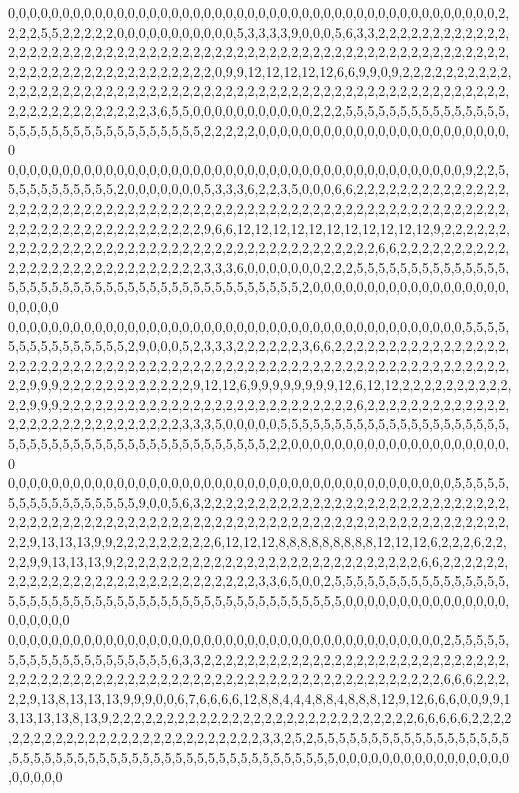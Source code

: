 0,0,0,0,0,0,0,0,0,0,0,0,0,0,0,0,0,0,0,0,0,0,0,0,0,0,0,0,0,0,0,0,0,0,0,0,0,0,0,0,0,0,0,0,0,2,2,2,2,5,5,2,2,2,2,2,0,0,0,0,0,0,0,0,0,0,0,5,3,3,3,3,9,0,0,0,5,6,3,3,2,2,2,2,2,2,2,2,2,2,2,2,2,2,2,2,2,2,2,2,2,2,2,2,2,2,2,2,2,2,2,2,2,2,2,2,2,2,2,2,2,2,2,2,2,2,2,2,2,2,2,2,2,2,2,2,2,2,2,2,2,2,2,2,2,2,2,2,2,2,2,2,2,2,2,2,2,0,9,9,12,12,12,12,12,6,6,9,9,0,9,2,2,2,2,2,2,2,2,2,2,2,2,2,2,2,2,2,2,2,2,2,2,2,2,2,2,2,2,2,2,2,2,2,2,2,2,2,2,2,2,2,2,2,2,2,2,2,2,2,2,2,2,2,2,2,2,2,2,2,2,2,2,2,2,2,2,2,2,2,3,6,5,5,0,0,0,0,0,0,0,0,0,0,0,2,2,2,5,5,5,5,5,5,5,5,5,5,5,5,5,5,5,5,5,5,5,5,5,5,5,5,5,5,5,5,5,5,5,5,5,2,2,2,2,2,0,0,0,0,0,0,0,0,0,0,0,0,0,0,0,0,0,0,0,0,0,0,0,0
0,0,0,0,0,0,0,0,0,0,0,0,0,0,0,0,0,0,0,0,0,0,0,0,0,0,0,0,0,0,0,0,0,0,0,0,0,0,0,0,0,0,9,2,2,5,5,5,5,5,5,5,5,5,5,5,2,0,0,0,0,0,0,0,5,3,3,3,6,2,2,3,5,0,0,0,6,6,2,2,2,2,2,2,2,2,2,2,2,2,2,2,2,2,2,2,2,2,2,2,2,2,2,2,2,2,2,2,2,2,2,2,2,2,2,2,2,2,2,2,2,2,2,2,2,2,2,2,2,2,2,2,2,2,2,2,2,2,2,2,2,2,2,2,2,2,2,2,2,2,2,2,2,2,2,2,9,6,6,12,12,12,12,12,12,12,12,12,12,12,9,2,2,2,2,2,2,2,2,2,2,2,2,2,2,2,2,2,2,2,2,2,2,2,2,2,2,2,2,2,2,2,2,2,2,2,2,2,2,2,2,6,6,2,2,2,2,2,2,2,2,2,2,2,2,2,2,2,2,2,2,2,2,2,2,2,2,2,2,2,2,3,3,3,6,0,0,0,0,0,0,0,2,2,2,5,5,5,5,5,5,5,5,5,5,5,5,5,5,5,5,5,5,5,5,5,5,5,5,5,5,5,5,5,5,5,5,5,5,5,5,5,5,5,5,5,2,0,0,0,0,0,0,0,0,0,0,0,0,0,0,0,0,0,0,0,0,0,0,0
0,0,0,0,0,0,0,0,0,0,0,0,0,0,0,0,0,0,0,0,0,0,0,0,0,0,0,0,0,0,0,0,0,0,0,0,0,0,0,0,0,0,5,5,5,5,5,5,5,5,5,5,5,5,5,5,5,2,9,0,0,0,5,2,3,3,3,2,2,2,2,2,2,3,6,6,2,2,2,2,2,2,2,2,2,2,2,2,2,2,2,2,2,2,2,2,2,2,2,2,2,2,2,2,2,2,2,2,2,2,2,2,2,2,2,2,2,2,2,2,2,2,2,2,2,2,2,2,2,2,2,2,2,2,2,2,2,2,2,2,9,9,9,2,2,2,2,2,2,2,2,2,2,2,2,9,12,12,6,9,9,9,9,9,9,9,9,12,6,12,12,2,2,2,2,2,2,2,2,2,2,2,2,9,9,9,2,2,2,2,2,2,2,2,2,2,2,2,2,2,2,2,2,2,2,2,2,2,2,2,2,2,2,6,2,2,2,2,2,2,2,2,2,2,2,2,2,2,2,2,2,2,2,2,2,2,2,2,2,2,2,2,2,3,3,3,5,0,0,0,0,0,5,5,5,5,5,5,5,5,5,5,5,5,5,5,5,5,5,5,5,5,5,5,5,5,5,5,5,5,5,5,5,5,5,5,5,5,5,5,5,5,5,5,5,5,5,2,2,0,0,0,0,0,0,0,0,0,0,0,0,0,0,0,0,0,0,0,0,0
0,0,0,0,0,0,0,0,0,0,0,0,0,0,0,0,0,0,0,0,0,0,0,0,0,0,0,0,0,0,0,0,0,0,0,0,0,0,0,0,0,5,5,5,5,5,5,5,5,5,5,5,5,5,5,5,5,5,9,0,0,5,6,3,2,2,2,2,2,2,2,2,2,2,2,2,2,2,2,2,2,2,2,2,2,2,2,2,2,2,2,2,2,2,2,2,2,2,2,2,2,2,2,2,2,2,2,2,2,2,2,2,2,2,2,2,2,2,2,2,2,2,2,2,2,2,2,2,2,2,2,2,2,2,2,2,2,2,2,2,9,13,13,13,9,9,2,2,2,2,2,2,2,2,2,6,12,12,12,8,8,8,8,8,8,8,8,8,12,12,12,6,2,2,2,6,2,2,2,2,9,9,13,13,13,9,2,2,2,2,2,2,2,2,2,2,2,2,2,2,2,2,2,2,2,2,2,2,2,2,2,2,2,2,6,6,2,2,2,2,2,2,2,2,2,2,2,2,2,2,2,2,2,2,2,2,2,2,2,2,2,2,2,2,2,3,3,6,5,0,0,2,5,5,5,5,5,5,5,5,5,5,5,5,5,5,5,5,5,5,5,5,5,5,5,5,5,5,5,5,5,5,5,5,5,5,5,5,5,5,5,5,5,5,5,5,5,5,5,0,0,0,0,0,0,0,0,0,0,0,0,0,0,0,0,0,0,0,0,0
0,0,0,0,0,0,0,0,0,0,0,0,0,0,0,0,0,0,0,0,0,0,0,0,0,0,0,0,0,0,0,0,0,0,0,0,0,0,0,0,2,5,5,5,5,5,5,5,5,5,5,5,5,5,5,5,5,5,5,5,5,6,3,3,2,2,2,2,2,2,2,2,2,2,2,2,2,2,2,2,2,2,2,2,2,2,2,2,2,2,2,2,2,2,2,2,2,2,2,2,2,2,2,2,2,2,2,2,2,2,2,2,2,2,2,2,2,2,2,2,2,2,2,2,2,2,2,2,2,2,2,2,6,6,6,2,2,2,2,2,9,13,8,13,13,13,9,9,9,0,0,6,7,6,6,6,6,12,8,8,4,4,4,8,8,4,8,8,8,12,9,12,6,6,6,0,0,9,9,13,13,13,13,8,13,9,2,2,2,2,2,2,2,2,2,2,2,2,2,2,2,2,2,2,2,2,2,2,2,2,2,2,2,2,6,6,6,6,6,2,2,2,2,2,2,2,2,2,2,2,2,2,2,2,2,2,2,2,2,2,2,2,2,2,2,2,3,3,2,5,2,5,5,5,5,5,5,5,5,5,5,5,5,5,5,5,5,5,5,5,5,5,5,5,5,5,5,5,5,5,5,5,5,5,5,5,5,5,5,5,5,5,5,5,5,5,5,5,5,0,0,0,0,0,0,0,0,0,0,0,0,0,0,0,0,0,0,0,0,0
